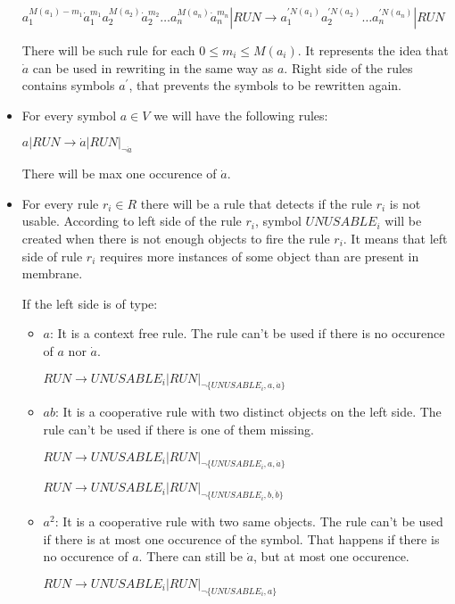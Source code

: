 \documentclass[a4paper,10pt]{article}
\begin{document}
\begin{dokaz}
\begin{itemize}
    $a_1^{M(a_1)-m_1}\dot{a}_1^{m_1}a_2^{M(a_2)}\dot{a}_2^{m_2}\dots a_n^{M(a_n)}\dot{a}_n^{m_n}|RUN \rightarrow a_1^{\prime N(a_1)}a_2^{\prime N(a_2)}\dots a_n^{\prime N(a_n)}|RUN$

    There will be such rule for each $0\leq m_i\leq M(a_i)$. It represents the idea that $\dot{a}$ can be used in rewriting in the same way as $a$. Right side of the rules contains symbols $a^\prime$, that prevents the symbols to be rewritten again.

    \item For every symbol $a\in V$ we will have the following rules:

    $a|RUN \rightarrow \dot{a}|RUN|_{\neg \dot{a}}$

    There will be max one occurence of $\dot{a}$.

    \item For every rule $r_i\in R$ there will be a rule that detects if the rule $r_i$ is not usable. According to left side of the rule $r_i$, symbol $UNUSABLE_i$ will be created when there is not enough objects to fire the rule $r_i$. It means that left side of rule $r_i$ requires more instances of some object than are present in membrane.

    If the left side is of type:
    \begin{itemize}
      \item $a$: It is a context free rule. The rule can't be used if there is no occurence of $a$ nor $\dot{a}$.

      $RUN \rightarrow UNUSABLE_i|RUN|_{\neg\{UNUSABLE_i, a, \dot{a}\}}$

      \item $ab$: It is a cooperative rule with two distinct objects on the left side. The rule can't be used if there is one of them missing.

      $RUN \rightarrow UNUSABLE_i|RUN|_{\neg\{UNUSABLE_i, a, \dot{a}\}}$

      $RUN \rightarrow UNUSABLE_i|RUN|_{\neg\{UNUSABLE_i, b, \dot{b}\}}$

      \item $a^2$: It is a cooperative rule with two same objects. The rule can't be used if there is at most one occurence of the symbol. That happens if there is no occurence of $a$. There can still be $\dot{a}$, but at most one occurence.

      $RUN \rightarrow UNUSABLE_i|RUN|_{\neg\{UNUSABLE_i, a\}}$
    \end{itemize}


\end{itemize}
\end{dokaz}
\end{document}
